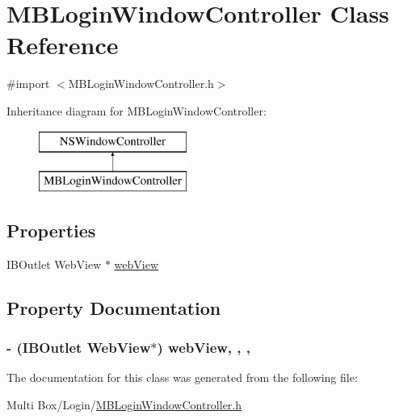 \hypertarget{interface_m_b_login_window_controller}{\section{M\-B\-Login\-Window\-Controller Class Reference}
\label{interface_m_b_login_window_controller}
}


{\ttfamily \#import $<$M\-B\-Login\-Window\-Controller.\-h$>$}

Inheritance diagram for M\-B\-Login\-Window\-Controller\-:\begin{figure}[H]
\begin{center}
\leavevmode
\includegraphics[height=2.000000cm]{interface_m_b_login_window_controller}
\end{center}
\end{figure}
\subsection*{Properties}
\begin{DoxyCompactItemize}
\item 
I\-B\-Outlet Web\-View $\ast$ \hyperlink{interface_m_b_login_window_controller_afc3785e812e8598068cd1af5f9cd2cf9}{web\-View}
\end{DoxyCompactItemize}


\subsection{Property Documentation}
\hypertarget{interface_m_b_login_window_controller_afc3785e812e8598068cd1af5f9cd2cf9}{
\subsubsection[{web\-View}]{\setlength{\rightskip}{0pt plus 5cm}-\/ (I\-B\-Outlet Web\-View$\ast$) web\-View\hspace{0.3cm}{\ttfamily [read]}, {\ttfamily [write]}, {\ttfamily [nonatomic]}, {\ttfamily [strong]}}}\label{interface_m_b_login_window_controller_afc3785e812e8598068cd1af5f9cd2cf9}


The documentation for this class was generated from the following file\-:\begin{DoxyCompactItemize}
\item 
Multi Box/\-Login/\hyperlink{_m_b_login_window_controller_8h}{M\-B\-Login\-Window\-Controller.\-h}\end{DoxyCompactItemize}
